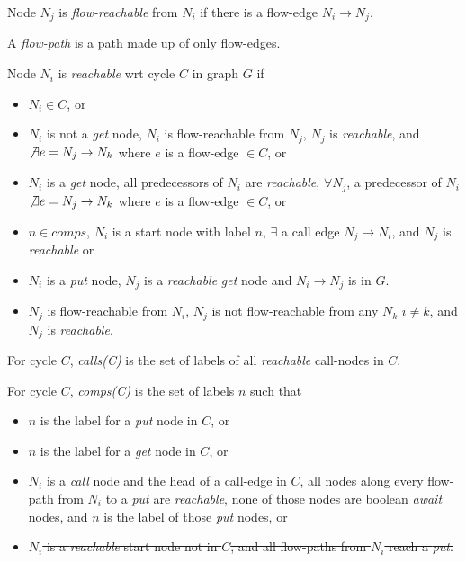 \documentclass[12pt]{article}%
\begin{document}
\begin{definition}
Node $N_j$ is \emph{flow-reachable} from $N_i$ if there is a flow-edge $N_i \rightarrow N_j$. 
\end{definition}

\begin{definition}
A \emph{flow-path} is a path made up of only flow-edges.
\end{definition}

\begin{definition}
\label{defn-reachable}
Node $N_i$ is \emph{reachable} wrt cycle $C$ in graph $G$ if
\begin{itemize}
\item $N_i \in C$, or
\item $N_i$ is not a \emph{get} node, $N_i$ is flow-reachable from $N_j$, $N_j$ is \emph{reachable}, and $\not\exists e = N_j \rightarrow N_k$ where $e$ is a flow-edge $\in C$, or
\item $N_i$ is a \emph{get} node, all predecessors of $N_i$ are \emph{reachable}, $\forall N_j$, a predecessor of $N_i$
$\not\exists e = N_j \rightarrow N_k$ where $e$ is a flow-edge $\in C$, or
\item $n \in {comps}$, $N_i$ is a start node with label $n$, $\exists$ a call edge $N_j \rightarrow N_i$, and $N_j$ is \emph{reachable} or

\item $N_i$ is a \emph{put} node, $N_j$ is a \emph{reachable} \emph{get} node and $N_i \rightarrow N_j$ is in $G$. %
\item $N_j$ is flow-reachable from $N_i$, $N_j$ is not flow-reachable from any  $N_k$ $i \not = k$, and $N_j$ is \emph{reachable}.


\end{itemize}
\end{definition}

\begin{definition}
\label{defn-calls}
For cycle $C$, \emph{calls(C)} is the set of labels of all \emph{reachable} call-nodes in $C$.
\end{definition}

\begin{definition}
\label{defn-comps}
For cycle $C$, \emph{comps(C)} is the set of labels ${n}$ such that 
\begin{itemize}
\item ${n}$ is the label for a \emph{put} node in $C$, or
\item ${n}$ is the label for a \emph{get} node in $C$, or 
\item $N_i$ is a \emph{call} node and the head of a call-edge in $C$, all nodes along every flow-path from $N_i$ to a \emph{put} are \emph{reachable},
none of those nodes are boolean \emph{await} nodes, and $n$ is the label of those \emph{put} nodes, or
\item \sout{$N_i$ is a \emph{reachable} start node not in $C$, and all flow-paths from $N_i$ reach a \emph{put}.}
\end{itemize}

\end{definition}
\end{document}
